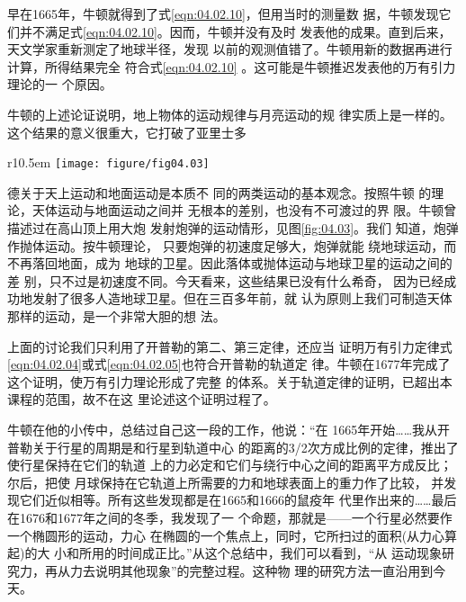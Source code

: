 \documentclass[../outline-of-mechanics.tex]{subfiles}
\begin{document}
早在1665年，牛顿就得到了式\eqref{eqn:04.02.10}，但用当时的测量数
据，牛顿发现它们并不满足式\eqref{eqn:04.02.10}。因而，牛顿并没有及时
发表他的成果。直到后来，天文学家重新测定了地球半径，发现
以前的观测值错了。牛顿用新的数据再进行计算，所得结果完全
符合式\eqref{eqn:04.02.10} 。这可能是牛顿推迟发表他的万有引力理论的一
个原因。

牛顿的上述论证说明，地上物体的运动规律与月亮运动的规
律实质上是一样的。这个结果的意义很重大，它打破了亚里士多
\begin{wrapfigure}[11]{r}{10.5em}
  \centering
  \texttt{[image: figure/fig04.03]}
  \caption{天体运动和地面运动无原则差别}
  \label{fig:04.03}
\end{wrapfigure}
德关于天上运动和地面运动是本质不
同的两类运动的基本观念。按照牛顿
的理论，天体运动与地面运动之间并
无根本的差别，也没有不可渡过的界
限。牛顿曾描述过在高山顶上用大炮
发射炮弹的运动情形，见图\ref{fig:04.03}。我们
知道，炮弹作抛体运动。按牛顿理论，
只要炮弹的初速度足够大，炮弹就能
绕地球运动，而不再落回地面，成为
地球的卫星。因此落体或抛体运动与地球卫星的运动之间的差
别，只不过是初速度不同。今天看来，这些结果已没有什么希奇，
因为已经成功地发射了很多人造地球卫星。但在三百多年前，就
认为原则上我们可制造天体那样的运动，是一个非常大胆的想
法。

上面的讨论我们只利用了开普勒的第二、第三定律，还应当
证明万有引力定律式\eqref{eqn:04.02.04}或式\eqref{eqn:04.02.05}也符合开普勒的轨道定
律。牛顿在1677年完成了这个证明，使万有引力理论形成了完整
的体系。关于轨道定律的证明，已超出本课程的范围，故不在这
里论述这个证明过程了。

牛顿在他的小传中，总结过自己这一段的工作，他说：“在
1665年开始……我从开普勒关于行星的周期是和行星到轨道中心
的距离的3/2次方成比例的定律，推出了使行星保持在它们的轨道
上的力必定和它们与绕行中心之间的距离平方成反比；尔后，把使
月球保持在它轨道上所需要的力和地球表面上的重力作了比较，
并发现它们近似相等。所有这些发现都是在1665和1666的鼠疫年
代里作出来的……最后在1676和1677年之间的冬季，我发现了一
个命题，那就是——一个行星必然要作一个椭圆形的运动，力心
在椭圆的一个焦点上，同时，它所扫过的面积(从力心算起)的大
小和所用的时间成正比。”从这个总结中，我们可以看到，“从
运动现象研究力，再从力去说明其他现象”的完整过程。这种物
理的研究方法一直沿用到今天。
\end{document}
